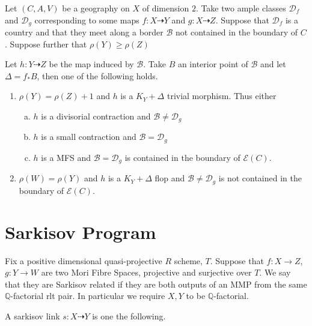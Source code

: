 	
	\begin{lemma}\cite[Lemma 3.5]{hacon2009sarkisov}\label{links}
		Let $(C,A,V)$ be a geography on $X$ of dimension $2$. Take two ample classes $\mathcal{D}_{f}$ and $\mathcal{D}_{g}$ corresponding to some maps $f:X \dashrightarrow Y$ and $g: X\dashrightarrow Z$. Suppose that $\mathcal{D}_{f}$ is a country and that they meet along a border $\mathcal{B}$ not contained in the boundary of $C$. Suppose further that $\rho(Y) \geq \rho(Z)$
		
		Let $h: Y \dashrightarrow Z$ be the map induced by $\mathcal{B}$. Take $B$ an interior point of $\mathcal{B}$ and let $\Delta=f_{*}B$, then one of the following holds.
			\begin{enumerate}
			\item $\rho(Y)=\rho(Z)+1$ and $h$ is a $K_{Y}+\Delta$ trivial morphism. Thus either
			\begin{enumerate}[a)]
				\item $h$ is a divisorial contraction and $\mathcal{B} \neq \mathcal{D}_{g}$
				\item $h$ is a small contraction and $\mathcal{B}=\mathcal{D}_{g}$
				\item $h$ is a MFS and $\mathcal{B}=\mathcal{D}_{g}$ is contained in the boundary of $\mathcal{E}(C)$.
			\end{enumerate}
			\item $\rho(W)=\rho(Y)$ and $h$ is a $K_{Y}+\Delta$ flop and $\mathcal{B} \neq \mathcal{D}_{g}$ is not contained in the boundary of $\mathcal{E}(C)$.
		\end{enumerate}
	\end{lemma}
	
	

\section{Sarkisov Program} \label{Sarkisov-section}

Fix a positive dimensional quasi-projective $R$ scheme, $T$. Suppose that $f:X \to Z$, $g:Y \to W$ are two Mori Fibre Spaces, projective and surjective over $T$. We say that they are Sarkisov related if they are both outputs of an MMP from the same $\mathbb{Q}$-factorial rlt pair. In particular we require $X,Y$ to be $\mathbb{Q}$-factorial. 

A sarkisov link $s:X \dashrightarrow Y$ is one the following.

